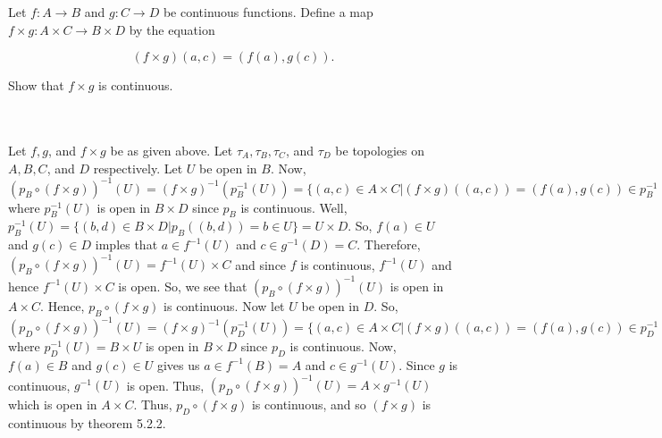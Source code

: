 Let $f: A \to B$ and $g: C \to D$ be continuous functions. Define a map
$f\times g: A\times C \to B\times D$ by the equation

$$(f\times g)(a,c) = (f(a), g(c)).$$

Show that $f\times g$ is continuous.\\\\

\begin{solution}\renewcommand{\qedsymbol}{}\ \\
    Let $f, g$, and $f\times g$ be as given above. Let $\tau_A, \tau_B, \tau_C$, and $\tau_D$ be
    topologies on $A, B, C$, and $D$ respectively. Let $U$ be open in $B$. Now,
    $(p_B\circ(f\times g))^{-1}(U)=(f\times g)^{-1}(p_B^{-1}(U))=
    \{(a,c)\in A\times C|(f\times g)((a,c))=(f(a),g(c))\in p_B^{-1}(U)\}$ where $p_B^{-1}(U)$ is open
    in $B\times D$ since $p_B$ is continuous. Well,
    $p_B^{-1}(U)=\{(b,d)\in B\times D|p_B((b,d))=b\in U\}=U\times D$. So, $f(a)\in U$ and $g(c)\in D$
    imples that $a\in f^{-1}(U)$ and $c\in g^{-1}(D)=C$. Therefore,
    $(p_B\circ(f\times g))^{-1}(U)=f^{-1}(U)\times C$ and since $f$ is continuous, $f^{-1}(U)$ and
    hence $f^{-1}(U)\times C$ is open. So, we see that $(p_B\circ(f\times g))^{-1}(U)$ is open in
    $A\times C$. Hence, $p_B\circ(f\times g)$ is continuous. Now let $U$ be open in $D$. So,
    $(p_D\circ(f\times g))^{-1}(U)=(f\times g)^{-1}(p_D^{-1}(U))=\{(a,c)\in A\times C|(f\times g)((a,c))
    =(f(a),g(c))\in p_D^{-1}(U)\}$ where $p_D^{-1}(U)=B\times U$ is open in $B\times D$ since $p_D$ is
    continuous. Now, $f(a)\in B$ and $g(c)\in U$ gives us $a\in f^{-1}(B)=A$ and $c\in g^{-1}(U)$. Since
    $g$ is continuous, $g^{-1}(U)$ is open. Thus, $(p_D\circ(f\times g))^{-1}(U)=A\times g^{-1}(U)$
    which is open in $A\times C$. Thus, $p_D\circ(f\times g)$ is continuous, and so $(f\times g)$
    is continuous by theorem 5.2.2. 

\end{solution}